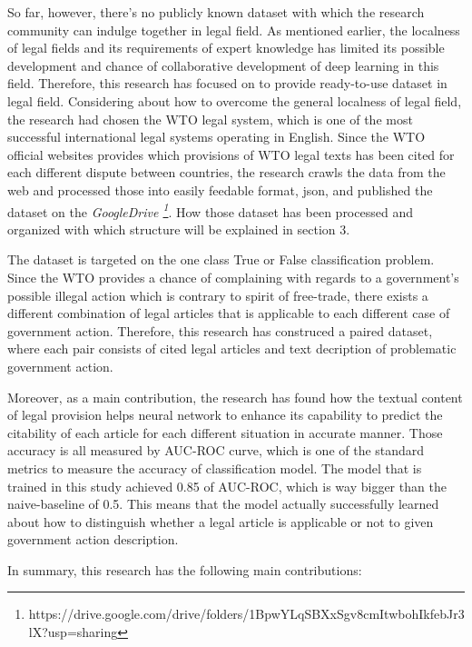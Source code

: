 \documentclass[sigconf]{acmart}
\begin{document}
So far, however, there's no publicly known dataset with which the research community can indulge together in legal field. As mentioned earlier, the localness of legal fields and its requirements of expert knowledge has limited its possible development and chance of collaborative development of deep learning in this field. Therefore, this research has focused on to provide ready-to-use dataset in legal field. Considering about how to overcome the general localness of legal field, the research had chosen the WTO legal system, which is one of the most successful international legal systems operating in English. Since the WTO official websites provides which provisions of WTO legal texts has been cited for each different dispute between countries, the research crawls the data from the web and processed those into easily feedable format, json, and published the dataset on the \textit{GoogleDrive \footnote{https://drive.google.com/drive/folders/1BpwYLqSBXxSgv8cmItwbohIkfebJr3lX?usp=sharing}}. How those dataset has been processed and organized with which structure will be explained in section 3.

The dataset is targeted on the one class True or False
classification problem. Since the WTO provides a chance of complaining with regards to a government's possible illegal action which is contrary to spirit of free-trade, there exists a different combination of legal articles that is applicable to each different case of government action. Therefore, this research has construced a paired dataset, where each pair consists of cited legal articles and text decription of problematic government action. 


Moreover, as a main contribution, the research has found how the textual content of legal provision helps neural network to enhance its capability to predict the citability of each article for each different situation in accurate manner. Those accuracy is all measured by AUC-ROC curve, which is one of the standard metrics to measure the accuracy of classification model. The model that is trained in this study achieved 0.85 of AUC-ROC, which is way bigger than the naive-baseline of 0.5. This means that the model actually successfully learned about how to distinguish whether a legal article is applicable or not to given government action description.\vspace{0.5mm}

In summary, this research has the following main contributions: \vspace{2mm}
\end{document}
